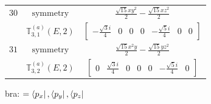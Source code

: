 \documentclass[fleqn,8pt,landscape]{jsarticle}
\begin{document}
\begin{longtable}{ccc}
$ 30 $ & $ \text{symmetry} $ & $ \frac{\sqrt{15} x y^{2}}{2} - \frac{\sqrt{15} x z^{2}}{2} $ \\
$  $ & $ \mathbb{T}_{3,1}^{(a)}(E,2) $ & $ \begin{bmatrix} - \frac{\sqrt{3} i}{4} & 0 & 0 & 0 & - \frac{\sqrt{5} i}{4} & 0 & 0 \end{bmatrix} $ \\ \hline
$ 31 $ & $ \text{symmetry} $ & $ \frac{\sqrt{15} x^{2} y}{2} - \frac{\sqrt{15} y z^{2}}{2} $ \\
$  $ & $ \mathbb{T}_{3,2}^{(a)}(E,2) $ & $ \begin{bmatrix} 0 & \frac{\sqrt{3} i}{4} & 0 & 0 & 0 & - \frac{\sqrt{5} i}{4} & 0 \end{bmatrix} $ \\ \hline
\end{longtable}
bra: $=\bra{p_{x}}, \bra{p_{y}}, \bra{p_{z}}$
\end{document}
